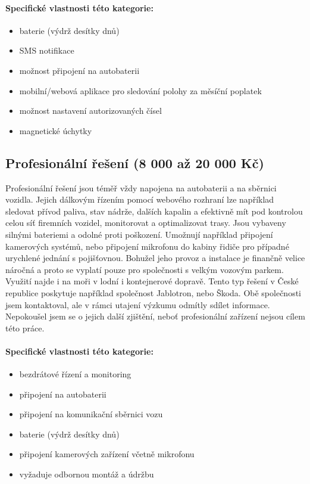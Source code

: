 \documentclass[FM,MP]{tulthesis}  %
\begin{document}
\paragraph{Specifické vlastnosti této kategorie:}
\begin{itemize}
\item baterie (výdrž desítky dnů)
\item SMS notifikace
\item možnost připojení na autobaterii
\item mobilní/webová aplikace pro sledování polohy za měsíční poplatek
\item možnost nastavení autorizovaných čísel
\item magnetické úchytky
\end{itemize}

\subsection{Profesionální řešení (8 000 až 20 000 Kč)}
Profesionální řešení jsou téměř vždy napojena na autobaterii a na sběrnici vozidla. Jejich dálkovým řízením pomocí webového rozhraní lze například sledovat přívod paliva, stav nádrže, dalších kapalin a efektivně mít pod kontrolou celou síť firemních vozidel, monitorovat a optimalizovat trasy. Jsou vybaveny silnými bateriemi a odolné proti poškození. Umožnují například připojení kamerových systémů, nebo připojení mikrofonu do kabiny řidiče pro případné urychlené jednání s pojišťovnou. Bohužel jeho provoz a instalace je finančně velice náročná a proto se vyplatí pouze pro společnosti s velkým vozovým parkem. Využití najde i na moři v lodní i kontejnerové dopravě. Tento typ řešení v České republice poskytuje například společnost Jablotron, nebo Škoda. Obě společnosti jsem kontaktoval, ale v rámci utajení výzkumu odmítly sdílet informace. Nepokoušel jsem se o jejich další zjištění, neboť profesionální zařízení nejsou cílem této práce. 

\paragraph{Specifické vlastnosti této kategorie:}
\begin{itemize}
\item bezdrátové řízení a monitoring
\item připojení na autobaterii
\item připojení na komunikační sběrnici vozu
\item baterie (výdrž desítky dnů)
\item připojení kamerových zařízení včetně mikrofonu
\item vyžaduje odbornou montáž a údržbu
\end{itemize}
\end{document}
